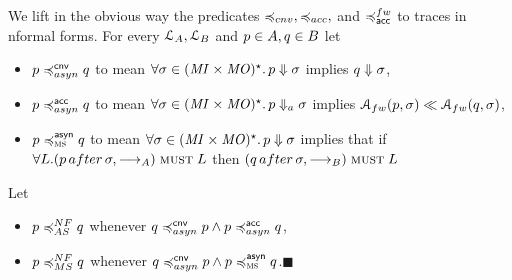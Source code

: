 



We lift in the obvious way the predicates $\bhvleqone, \bhvleqtwo, $
and $\asleqAfw$ to traces in nformal forms.
For every $\mathcal{L}_A, \mathcal{L}_B$ and $p \in A, q \in B$ let
\begin{itemize}
  \item 
    $\serverA \asynleqone \serverB$
    to mean 
  $\forall \sigma \in (\mathit{MI} \times \mathit{MO})^\star . \, p \mathrel{\Downarrow}{ \sigma }$
    implies $q \mathrel{\Downarrow}{ \sigma }$,

    \item 
      $\serverA \asynleqtwo \serverB$ to mean
      $\forall \sigma \in (\mathit{MI} \times \mathit{MO})^\star . \, p \Downarrow_{a}{\sigma}$
      implies $\accht{ \serverA }{ \sigma } \ll \accht{ \serverB }{ \sigma }$,
      
    \item
      $p \preccurlyeq^{\textsf{asyn}}_{\textsc{ms}} q$
      to mean
      $\forall \sigma \in (\mathit{MI} \times \mathit{MO})^\star . \, p \mathrel{\Downarrow}{ \sigma }$
      implies that if $
\forall L . \after{\serverA}{ \sigma }{ \st{}_\StatesA} \mathrel{\opMust} L$ then $\after{\serverB}{\sigma}{\st{}_\StatesB} \mathrel{\opMust} L$
\end{itemize}

\begin{definition}%
  \label{def:asyn-leq}%
  Let
  \begin{itemize}
  \item $\serverA \asleqNF \serverB$ whenever
    $\serverB \asynleqone \serverA  \wedge  \serverA \asynleqtwo \serverB$,
    
  \item
    $ \serverA \msleqNF \serverB$ whenever $ \serverB \asynleqone
    \serverA  \wedge  \serverA \preccurlyeq^{\asyn}_{\textsc{ms}} \serverB$.\hfill$\blacksquare$
  \end{itemize}
\end{definition}


